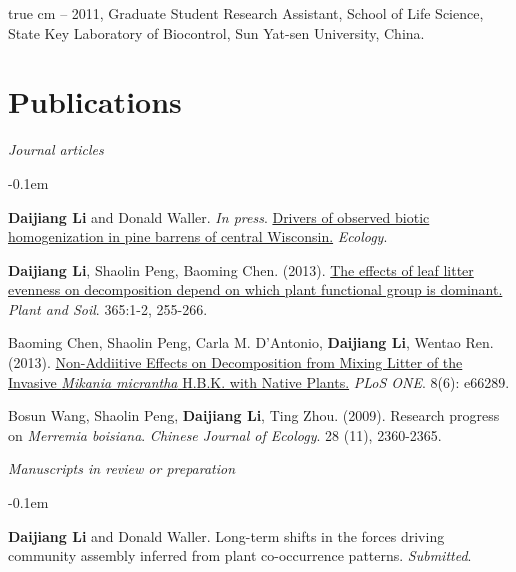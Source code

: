 \documentclass[11pt,oneside]{article}
\def\ind{\vspace{0.3em} \hangindent=1.25 true cm\hangafter=1 \noindent }
\begin{document}
\ind 2008 -- 2011, Graduate Student Research Assistant, School of Life Science, State Key Laboratory of Biocontrol, Sun Yat-sen University, China.

\section{Publications}
\noindent\emph{Journal articles}
\vspace{0.05in}
\begin{revnumerate}
\itemsep -0.1em 
	\item \textbf{Daijiang Li} and Donald Waller. \emph{In press}. \href{http://www.esajournals.org/doi/abs/10.1890/14-0893.1}{Drivers of observed biotic homogenization in pine barrens of central Wisconsin.} \emph{Ecology}.

	\item \textbf{Daijiang Li}, Shaolin Peng, Baoming Chen. (2013). \href{http://www.daijiang.name/pdf/D_Li_2012_plantsoil.pdf}{The effects of leaf litter evenness on decomposition depend on which plant functional group is dominant.} \emph{Plant and Soil}. 365:1-2, 255-266. 

	\item Baoming Chen, Shaolin Peng, Carla M. D'Antonio, \textbf{Daijiang Li}, Wentao Ren. (2013). \href{http://www.plosone.org/article/info%3Adoi%2F10.1371%2Fjournal.pone.0066289}{Non-Addiitive Effects on Decomposition from Mixing Litter of the Invasive \emph{Mikania micrantha} H.B.K. with Native Plants.} \emph{PLoS ONE}. 8(6): e66289.


	\item Bosun Wang, Shaolin Peng, \textbf{Daijiang Li}, Ting Zhou. (2009). Research progress on \emph{Merremia boisiana}. \emph{Chinese Journal of Ecology}. 28 (11), 2360-2365.
\end{revnumerate}

\noindent\emph{Manuscripts in review or preparation}
\vspace{0.05in}
\begin{revnumerate}
\itemsep -0.1em 
	\item \textbf{Daijiang Li} and Donald Waller. Long-term shifts in the forces driving community assembly inferred from plant co-occurrence patterns. \emph{Submitted}.
\end{revnumerate}
\end{document}
